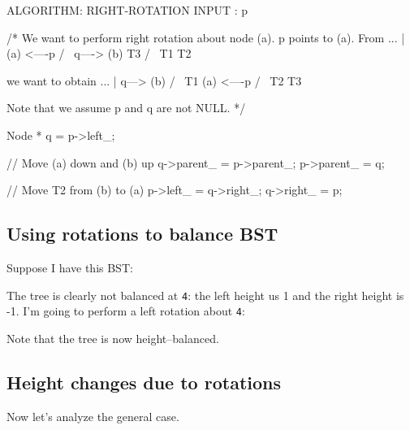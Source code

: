 {\small
\begin{console}
ALGORITHM: RIGHT-ROTATION
INPUT    : p

/* We want to perform right rotation about node (a). p points
to (a). From
                   ...
                    |
                   (a) <----p
                   / \
          q----> (b)  T3 
                 / \
               T1   T2

we want to obtain
                    ...
                     |
              q---> (b)
                    / \
                  T1  (a) <----p
                      / \   
                    T2   T3

Note that we assume p and q are not NULL.
*/

    Node * q = p->left_;

    // Move (a) down and (b) up
    q->parent_ = p->parent_;  
    p->parent_ = q;           

    // Move T2 from (b) to (a)
    p->left_ = q->right_;   
    q->right_ = p;
\end{console}
}

\newpage
\subsection{Using rotations to balance BST}

Suppose I have this BST:


The tree is clearly not balanced at \verb!4!: the left height us 1
and the right height is -1.
I'm going to perform a left rotation about \verb!4!:



Note that the tree is now height--balanced.


\newpage
\subsection{Height changes due to rotations}

Now let's analyze the general case.

